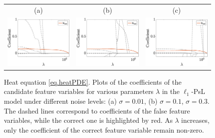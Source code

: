 \documentclass[a4paper,11pt]{article}
\theoremstyle{definition}
\begin{document}
\begin{figure}
\centering
\begin{tabular}{ccc}
(a)&(b)&(c)\\
\includegraphics[width=2in]{Figures/heat_0_01.eps}&
\includegraphics[width=2in]{Figures/heat_0_1.eps}&
\includegraphics[width=2in]{Figures/heat_0_3.eps}
\end{tabular}	
\caption{Heat equation \eqref{eq.heatPDE}. Plots of the coefficients of the candidate feature variables for various parameters $\lambda$ in the $\ell_1$-PsL model under different noise levels: (a) $\sigma=0.01$, (b) $\sigma=0.1$, $\sigma=0.3$. The dashed lines correspond to coefficients of the false feature variables, while the correct one is highlighted by red. As $\lambda$ increases, only the coefficient of the correct feature variable remain non-zero.}\label{expr.heat}
\end{figure}

%
%
\end{document}
